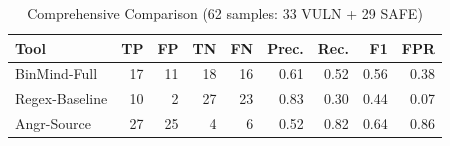 \begin{table}[htbp]
\centering
\caption{Comprehensive Comparison (62 samples: 33 VULN + 29 SAFE)}
\label{tab:comprehensive-comparison}
\begin{tabular}{lrrrrrrrr}
\toprule
Tool & TP & FP & TN & FN & Prec. & Rec. & F1 & FPR \\
\midrule
BinMind-Full & 17 & 11 & 18 & 16 & 0.61 & 0.52 & 0.56 & 0.38 \\
Regex-Baseline & 10 & 2 & 27 & 23 & 0.83 & 0.30 & 0.44 & 0.07 \\
Angr-Source & 27 & 25 & 4 & 6 & 0.52 & 0.82 & 0.64 & 0.86 \\
\bottomrule
\end{tabular}
\end{table}
